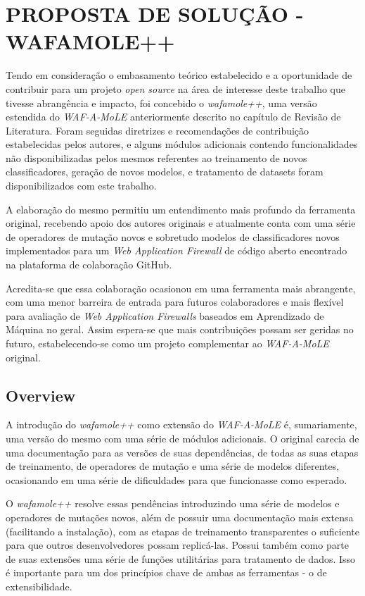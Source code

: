 \chapter{PROPOSTA DE SOLUÇÃO - WAFAMOLE++}
\label{chp:capitulo4}

Tendo em consideração o embasamento teórico estabelecido e a oportunidade de contribuir para um projeto \textit{open source} na área de interesse deste trabalho que tivesse abrangência e impacto, foi concebido o \textit{wafamole++}, uma versão estendida do \textit{WAF-A-MoLE} anteriormente descrito no capítulo de Revisão de Literatura. Foram seguidas diretrizes e recomendações de contribuição estabelecidas pelos autores, e alguns módulos adicionais contendo funcionalidades não disponibilizadas pelos mesmos referentes ao treinamento de novos classificadores, geração de novos modelos, e tratamento de datasets foram disponibilizados com este trabalho.

A elaboração do mesmo permitiu um entendimento mais profundo da ferramenta original, recebendo apoio dos autores originais e atualmente conta com uma série de operadores de mutação novos e sobretudo modelos de classificadores novos implementados para um \textit{Web Application Firewall} de código aberto encontrado na plataforma de colaboração GitHub.

Acredita-se que essa colaboração ocasionou em uma ferramenta mais abrangente, com uma menor barreira de entrada para futuros colaboradores e mais flexível para avaliação de \textit{Web Application Firewalls} baseados em Aprendizado de Máquina no geral. Assim espera-se que mais contribuições possam ser geridas no futuro, estabelecendo-se como um projeto complementar ao \textit{WAF-A-MoLE} original.

\section{Overview}
A introdução do \textit{wafamole++} como extensão do \textit{WAF-A-MoLE} é, sumariamente, uma versão do mesmo com uma série de módulos adicionais. O original carecia de uma documentação para as versões de suas dependências, de todas as suas etapas de treinamento, de operadores de mutação e uma série de modelos diferentes, ocasionando em uma série de dificuldades para que funcionasse como esperado.

O \textit{wafamole++} resolve essas pendências introduzindo uma série de modelos e operadores de mutações novos, além de possuir uma documentação mais extensa (facilitando a instalação), com as etapas de treinamento transparentes o suficiente para que outros desenvolvedores possam replicá-las. Possui também como parte de suas extensões uma série de funções utilitárias para tratamento de dados. Isso é importante para um dos princípios chave de ambas as ferramentas - o de extensibilidade. 

